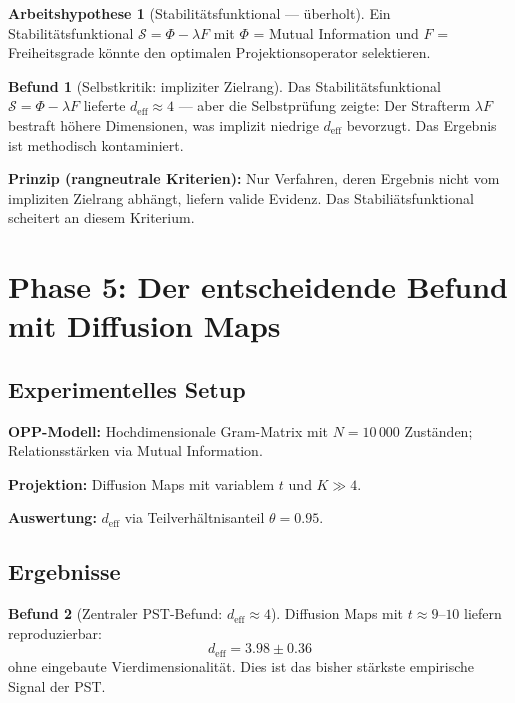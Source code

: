 \documentclass[11pt,a4paper]{article}
\theoremstyle{plain}
\theoremstyle{definition}
\newtheorem{befund}{Befund}[section]
\newtheorem{hypothese}{Arbeitshypothese}[section]
\newcommand{\deff}{d_{\mathrm{eff}}}
\begin{document}
\begin{hypothese}[Stabilit\"{a}tsfunktional --- \"{u}berholt]
Ein Stabilit\"{a}tsfunktional $\mathcal{S} = \Phi - \lambda F$ mit
$\Phi$ = Mutual Information und $F$ = Freiheitsgrade k\"{o}nnte
den optimalen Projektionsoperator selektieren.
\end{hypothese}

\begin{befund}[Selbstkritik: impliziter Zielrang]
Das Stabilit\"{a}tsfunktional $\mathcal{S} = \Phi - \lambda F$ lieferte
$\deff \approx 4$ --- aber die Selbstpr\"{u}fung zeigte: Der Strafterm
$\lambda F$ bestraft h\"{o}here Dimensionen, was implizit niedrige $\deff$
bevorzugt. Das Ergebnis ist methodisch kontaminiert.

\textbf{Prinzip (rangneutrale Kriterien):} Nur Verfahren, deren Ergebnis
nicht vom impliziten Zielrang abh\"{a}ngt, liefern valide Evidenz.
Das Stabili\"{a}tsfunktional scheitert an diesem Kriterium.
\end{befund}

\section{Phase 5: Der entscheidende Befund mit Diffusion Maps}

\subsection{Experimentelles Setup}

\textbf{OPP-Modell:} Hochdimensionale Gram-Matrix mit $N = 10\,000$
Zust\"{a}nden; Relationsst\"{a}rken via Mutual Information.

\textbf{Projektion:} Diffusion Maps mit variablem $t$ und $K \gg 4$.

\textbf{Auswertung:} $\deff$ via Teilverh\"{a}ltnisanteil $\theta = 0.95$.

\subsection{Ergebnisse}

\begin{befund}[Zentraler PST-Befund: $\deff \approx 4$]
Diffusion Maps mit $t \approx 9$--$10$ liefern reproduzierbar:
\[
  \boxed{\deff = 3.98 \pm 0.36}
\]
ohne eingebaute Vierdimensionalit\"{a}t. Dies ist das bisher st\"{a}rkste
empirische Signal der PST.
\end{befund}
\end{document}
